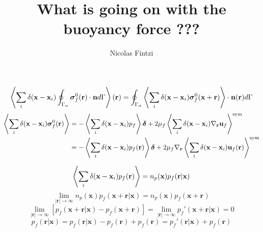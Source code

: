 \documentclass[12pt]{My_preprint}
\title{
    What is going on with the buoyancy force ??? 
    }
\author[1,2]{Nicolas Fintzi}
\begin{document}
\maketitle



\begin{equation}
    \left<\sum_i \delta(\textbf{x}-\textbf{x}_i) \oint_{\Gamma_{\alpha}}  \bm\sigma_f^0(\textbf{r}) \cdot \textbf{n} d\Gamma\right>(\textbf{r})
    =
    \oint_{\Gamma_{\alpha}}  \left<\sum_i \delta(\textbf{x}-\textbf{x}_i) \bm\sigma_f^0(\textbf{x}+ \textbf{r}) \right>\cdot \textbf{n}(\textbf{r}) d\Gamma
\end{equation}
\begin{align}
    \left<\sum_i \delta(\textbf{x}-\textbf{x}_i) \bm\sigma_f^0(\textbf{r}) \right>
    &=
    - \left<\sum_i \delta(\textbf{x}-\textbf{x}_i)  p_f \right>\bm\delta
    +2 \mu_f \left<\sum_i \delta(\textbf{x}-\textbf{x}_i) \mathbf{\nabla}_\textbf{r} \textbf{u}_f \right>^\text{sym}\\
    &=
    - \left<\sum_i \delta(\textbf{x}-\textbf{x}_i)  p_f(\textbf{r}) \right>\bm\delta
    +2 \mu_f \mathbf{\nabla}_\textbf{r} \left<\sum_i \delta(\textbf{x}-\textbf{x}_i)  \textbf{u}_f(\textbf{r})\right>^\text{sym}
\end{align}

\begin{equation}
    \left<\sum_i \delta(\textbf{x}-\textbf{x}_i)  p_f(\textbf{r}) \right>
    =
    n_p(\textbf{x}) p_f(\textbf{r}|\textbf{x})
\end{equation}
\begin{equation}
    \lim_{|\textbf{r}|\to\infty} 
    n_p(\textbf{x}) p_f(\textbf{x}+ \textbf{r}|\textbf{x}) 
    = 
    n_p(\textbf{x}) p_f(\textbf{x}+ \textbf{r})
\end{equation}
\begin{equation}
    \lim_{|\textbf{r}|\to\infty} 
    [p_f(\textbf{x}+ \textbf{r}|\textbf{x}) -p_f(\textbf{x}+ \textbf{r})]
    = 
    \lim_{|\textbf{r}|\to\infty} 
    p_f'(\textbf{x}+ \textbf{r}|\textbf{x}) 
    =0 
\end{equation}
\begin{equation}
    p_f(\textbf{r}|\textbf{x})
    = 
    p_f(\textbf{r}|\textbf{x})
    -p_f(\textbf{r})
    + p_f(\textbf{r})
    = 
    p_f'(\textbf{r}|\textbf{x})
    + p_f(\textbf{r})
\end{equation}
\end{document}
